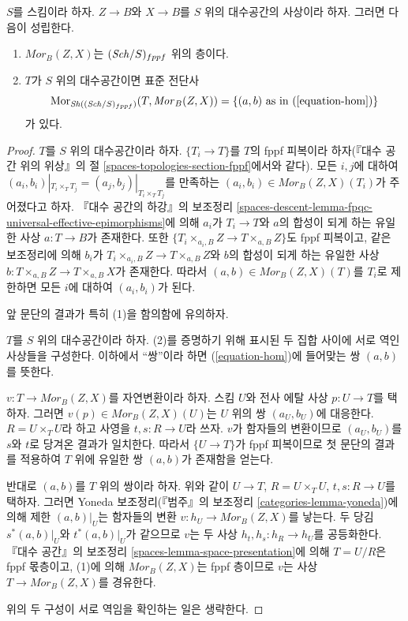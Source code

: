 \begin{lemma}
\label{lemma-hom-functor-sheaf}
$S$를 스킴이라 하자. $Z \to B$와 $X \to B$를
$S$ 위의 대수공간의 사상이라 하자. 그러면 다음이 성립한다.
\begin{enumerate}
\item $\mathit{Mor}_B(Z, X)$는 $(\mathit{Sch}/S)_{fppf}$ 위의 층이다.
\item $T$가 $S$ 위의 대수공간이면 표준 전단사
$$
\mathop{\mathrm{Mor}}\nolimits_{\mathop{\mathit{Sh}}\nolimits((\mathit{Sch}/S)_{fppf})}(T, \mathit{Mor}_B(Z, X))
=
\{(a, b)\text{ as in }(\ref{equation-hom})\}
$$
가 있다.
\end{enumerate}
\end{lemma}

\begin{proof}
$T$를 $S$ 위의 대수공간이라 하자. $\{T_i \to T\}$를 $T$의
fppf 피복이라 하자(『대수 공간 위의 위상』의 절
\ref{spaces-topologies-section-fppf}에서와 같다).
모든 $i, j$에 대하여
$(a_i, b_i)|_{T_i \times_T T_j} = (a_j, b_j)|_{T_i \times_T T_j}$를
만족하는 $(a_i, b_i) \in \mathit{Mor}_B(Z, X)(T_i)$가 주어졌다고 하자.
『대수 공간의 하강』의 보조정리
\ref{spaces-descent-lemma-fpqc-universal-effective-epimorphisms}에 의해
$a_i$가 $T_i \to T$와 $a$의 합성이 되게 하는 유일한 사상
$a : T \to B$가 존재한다. 또한
$\{T_i \times_{a_i, B} Z \to T \times_{a, B} Z\}$도 fppf 피복이고,
같은 보조정리에 의해 $b_i$가
$T_i \times_{a_i, B} Z \to T \times_{a, B} Z$와 $b$의 합성이 되게
하는 유일한 사상
$b : T \times_{a, B} Z \to T \times_{a, B} X$가 존재한다.
따라서 $(a, b) \in \mathit{Mor}_B(Z, X)(T)$를 $T_i$로 제한하면
모든 $i$에 대하여 $(a_i, b_i)$가 된다.

\medskip\noindent
앞 문단의 결과가 특히 (1)을 함의함에 유의하자.

\medskip\noindent
$T$를 $S$ 위의 대수공간이라 하자. (2)를 증명하기 위해 표시된
두 집합 사이에 서로 역인 사상들을 구성한다. 이하에서 “쌍”이라 하면
(\ref{equation-hom})에 들어맞는 쌍 $(a, b)$를 뜻한다.

\medskip\noindent
$v : T \to \mathit{Mor}_B(Z, X)$를 자연변환이라 하자.
스킴 $U$와 전사 에탈 사상 $p : U \to T$를 택하자.
그러면 $v(p) \in \mathit{Mor}_B(Z, X)(U)$는 $U$ 위의 쌍
$(a_U, b_U)$에 대응한다. $R = U \times_T U$라 하고 사영을
$t, s : R \to U$라 쓰자. $v$가 함자들의 변환이므로
$(a_U, b_U)$를 $s$와 $t$로 당겨온 결과가 일치한다.
따라서 $\{U \to T\}$가 fppf 피복이므로 첫 문단의 결과를 적용하여
$T$ 위에 유일한 쌍 $(a, b)$가 존재함을 얻는다.

\medskip\noindent
반대로 $(a, b)$를 $T$ 위의 쌍이라 하자. 위와 같이
$U \to T$, $R = U \times_T U$, $t, s : R \to U$를 택하자.
그러면 Yoneda 보조정리(『범주』의 보조정리
\ref{categories-lemma-yoneda})에 의해 제한 $(a, b)|_U$는
함자들의 변환 $v : h_U \to \mathit{Mor}_B(Z, X)$를 낳는다.
두 당김 $s^*(a, b)|_U$와 $t^*(a, b)|_U$가 같으므로 $v$는
두 사상 $h_t, h_s : h_R \to h_U$를 공등화한다.
『대수 공간』의 보조정리 \ref{spaces-lemma-space-presentation}에 의해
$T = U/R$은 fppf 몫층이고, (1)에 의해
$\mathit{Mor}_B(Z, X)$는 fppf 층이므로 $v$는 사상
$T \to \mathit{Mor}_B(Z, X)$를 경유한다.

\medskip\noindent
위의 두 구성이 서로 역임을 확인하는 일은 생략한다.
\end{proof}

